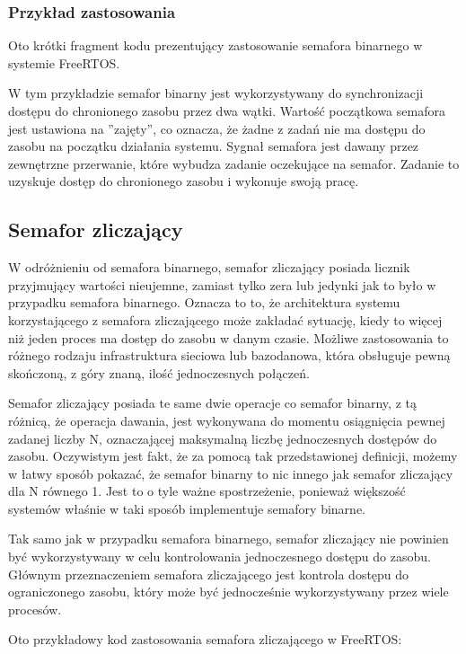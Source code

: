 \subsubsection{Przykład zastosowania}
Oto krótki fragment kodu prezentujący zastosowanie semafora binarnego w systemie FreeRTOS.

W tym przykładzie semafor binarny jest wykorzystywany do synchronizacji dostępu do chronionego zasobu przez dwa wątki.
Wartość początkowa semafora jest ustawiona na ''zajęty'', co oznacza, że żadne z zadań nie ma dostępu do zasobu na początku
działania systemu. Sygnał semafora jest dawany przez zewnętrzne przerwanie, które wybudza zadanie oczekujące na semafor.
Zadanie to uzyskuje dostęp do chronionego zasobu i wykonuje swoją pracę.

\subsection{Semafor zliczający}
W odróżnieniu od semafora binarnego, semafor zliczający posiada licznik przyjmujący wartości nieujemne, zamiast tylko zera lub jedynki
jak to było w przypadku semafora binarnego.
Oznacza to to, że architektura systemu korzystającego z semafora zliczającego może zakładać sytuację, kiedy to więcej niż jeden proces
ma dostęp do zasobu w danym czasie. Możliwe zastosowania to różnego rodzaju infrastruktura sieciowa lub bazodanowa,
która obsługuje pewną skończoną, z góry znaną, ilość jednoczesnych połączeń.

Semafor zliczający posiada te same dwie operacje co semafor binarny, z tą różnicą, że operacja dawania, jest wykonywana do momentu osiągnięcia
pewnej zadanej liczby N, oznaczającej maksymalną liczbę jednoczesnych dostępów do zasobu. Oczywistym jest fakt, że za pomocą tak przedstawionej
definicji, możemy w łatwy sposób pokazać, że semafor binarny to nic innego jak semafor zliczający dla N równego 1. Jest to o tyle ważne spostrzeżenie,
ponieważ większość systemów właśnie w taki sposób implementuje semafory binarne.

Tak samo jak w przypadku semafora binarnego, semafor zliczający nie powinien być wykorzystywany w celu kontrolowania jednoczesnego dostępu do zasobu.
Głównym przeznaczeniem semafora zliczającego jest kontrola dostępu do ograniczonego zasobu, który może być jednocześnie wykorzystywany przez wiele procesów.

Oto przykładowy kod zastosowania semafora zliczającego w FreeRTOS:

